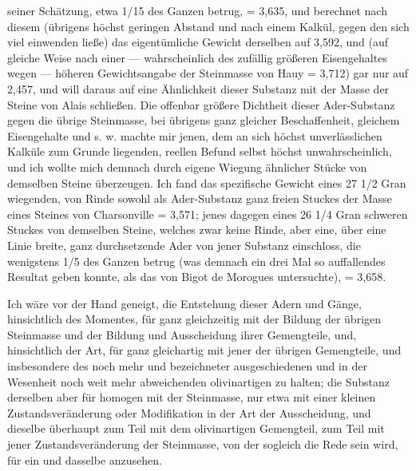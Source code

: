 \documentclass[a4paper, 11pt, oneside, german]{article}
\begin{document}
{seiner Schätzung, etwa 1/15 des Ganzen betrug, = 3,635, und berechnet nach diesem (übrigens höchst geringen Abstand und nach einem Kalkül, gegen den sich viel einwenden ließe) das eigentümliche Gewicht derselben auf 3,592, und (auf gleiche Weise nach einer --- wahrscheinlich des zufällig größeren Eisengehaltes wegen --- höheren Gewichtsangabe der Steinmasse von Hauy = 3,712) gar nur auf 2,457, und will daraus auf eine Ähnlichkeit dieser Substanz mit der Masse der Steine von Alais schließen. Die offenbar größere Dichtheit dieser Ader-Substanz gegen die übrige Steinmasse, bei übrigens ganz gleicher Beschaffenheit, gleichem Eisengehalte und s. w. machte mir jenen, dem an sich höchst unverlässlichen Kalküle zum Grunde liegenden, reellen Befund selbst höchst unwahrscheinlich, und ich wollte mich demnach durch eigene Wiegung ähnlicher Stücke von demselben Steine überzeugen. Ich fand das spezifische Gewicht eines 27 1/2 Gran wiegenden, von Rinde sowohl als Ader-Substanz ganz freien Stuckes der Masse eines Steines von Charsonville = 3,571; jenes dagegen eines 26 1/4 Gran schweren Stuckes von demselben Steine, welches zwar keine Rinde, aber eine, über eine Linie breite, ganz durchsetzende Ader von jener Substanz einschloss, die wenigstens 1/5 des Ganzen betrug (was demnach ein drei Mal so auffallendes Resultat geben konnte, als das von Bigot de Morogues untersuchte), = 3,658.}

Ich wäre vor der Hand geneigt, die Entstehung dieser Adern und Gänge, hinsichtlich des Momentes, für ganz gleichzeitig mit der Bildung der übrigen Steinmasse und der Bildung und Ausscheidung ihrer Gemengteile, und, hinsichtlich der Art, für ganz gleichartig mit jener der übrigen Gemengteile, und insbesondere des noch mehr und bezeichneter ausgeschiedenen und in der Wesenheit noch weit mehr abweichenden olivinartigen zu halten; die Substanz derselben aber für homogen mit der Steinmasse, nur etwa mit einer kleinen Zustandsveränderung oder Modifikation in der Art der Ausscheidung, und dieselbe überhaupt zum Teil mit dem olivinartigen Gemengteil, zum Teil mit jener Zustandsveränderung der Steinmasse, von der sogleich die Rede sein wird, für ein und dasselbe anzusehen.
\end{document}
